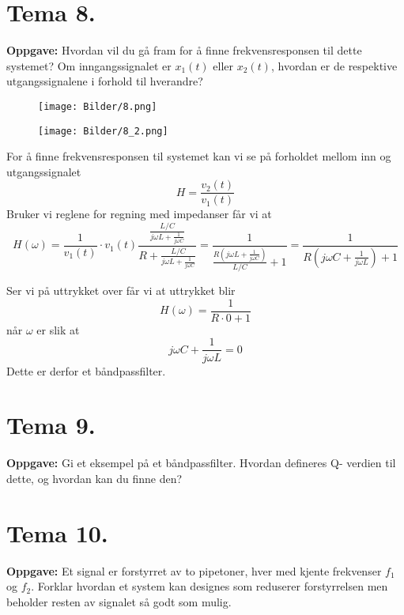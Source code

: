 \documentclass[a4paper,11pt,norsk]{article}
\begin{document}
\section{Tema 8.}
\begin{question}
    \textbf{Oppgave:}
        Hvordan vil du gå fram for å finne frekvensresponsen til dette systemet?
        Om inngangssignalet er $x_1(t)$ eller $x_2(t)$, hvordan er de respektive
        utgangssignalene i forhold til hverandre?

        \begin{figure}[H]
            \centering 
            \begin{minipage}{0.3\textwidth}
                \texttt{[image: Bilder/8.png]}
            \end{minipage}
            \begin{minipage}{0.3\textwidth}
                \texttt{[image: Bilder/8\_2.png]}
            \end{minipage}
        \end{figure}
\end{question}
For å finne frekvensresponsen til systemet kan vi se på forholdet mellom inn 
og utgangssignalet
\[
    H = \frac{v_2(t)}{v_1(t)}
\]
Bruker vi reglene for regning med impedanser får vi at
\[
    H(\omega) = \frac{1}{v_1(t)} \cdot v_1(t) \frac{\frac{L/C}{j\omega L + \frac{1}{j\omega C}}}{R + \frac{L/C}{j\omega L + \frac{1}{j\omega C}}} = \frac{1}{\frac{R(j\omega L + \frac{1}{j\omega C})}{L/C} + 1} = \frac{1}{R(j\omega C + \frac{1}{j\omega L}) + 1}
\]

Ser vi på uttrykket over får vi at uttrykket blir 
\[
    H(\omega) = \frac{1}{R \cdot 0 + 1}
\]
når $\omega$ er slik at
\[
    j\omega C + \frac{1}{j\omega L} = 0
\]
Dette er derfor et båndpassfilter. 

\newpage
\section{Tema 9.}
\begin{question}
    \textbf{Oppgave:}
        Gi et eksempel på et båndpassfilter. Hvordan defineres Q-
        verdien til dette, og hvordan kan du finne den?
\end{question}

\newpage
\section{Tema 10.}
\begin{question}
    \textbf{Oppgave:}
        Et signal er forstyrret av to pipetoner, hver med kjente
        frekvenser $f_1$ og $f_2$. Forklar hvordan et system kan designes
        som reduserer forstyrrelsen men beholder resten av
        signalet så godt som mulig.
\end{question}
\end{document}
